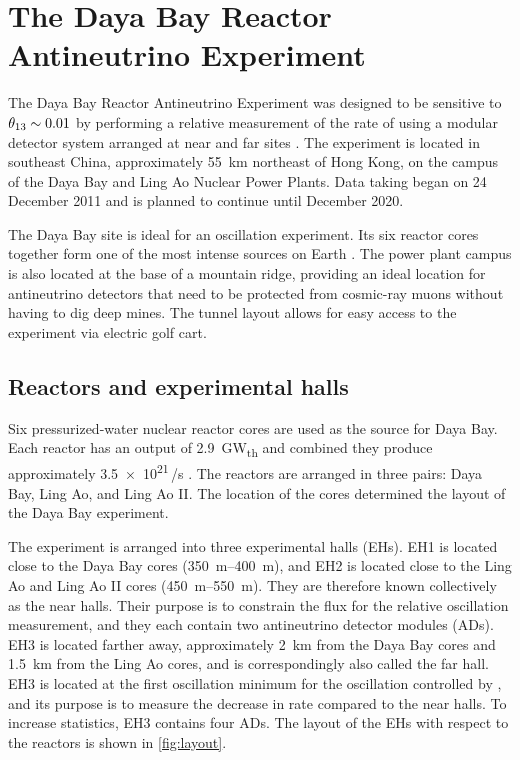 \chapter{The Daya Bay Reactor Antineutrino Experiment}
\label{ch:detector}

The Daya Bay Reactor Antineutrino Experiment was designed
to be sensitive to $\theta_{13} \sim 0.01$
by performing a relative measurement of the rate of \nuebar{}
using a modular detector system arranged at near and far sites \cite{dybproposal2006}.
The experiment is located in southeast China,
approximately \SI{55}{\km} northeast of Hong Kong,
on the campus of the Daya Bay and Ling Ao Nuclear Power Plants.
Data taking began on 24 December 2011 and is planned to continue
until December 2020.

The Daya Bay site is ideal for an oscillation experiment.
Its six reactor cores together form one of the most intense \nuebar{}
sources on Earth \cite{dybproposal2006}.
The power plant campus is also located at the base of a mountain ridge,
providing an ideal location for antineutrino detectors that need to be
protected from cosmic-ray muons without having to dig deep mines.
The tunnel layout allows for easy access to the experiment via electric golf cart.

\section{Reactors and experimental halls}

Six pressurized-water nuclear reactor cores are used
as the \nuebar{} source for Daya Bay.
Each reactor has an output of \SI{2.9}{\giga\watt_{th}}
and combined they produce approximately \num{3.5e21}\,\nuebar/s \cite{ngd2016}.
The reactors are arranged in three pairs: Daya Bay, Ling Ao, and Ling Ao II.
The location of the cores determined the layout of the Daya Bay experiment.

The experiment is arranged into three experimental halls (EHs).
EH1 is located close to the Daya Bay cores (\SIrange{350}{400}{\meter}),
and EH2 is located close to the Ling Ao and Ling Ao II cores
(\SIrange{450}{550}{\meter}).
They are therefore known collectively as the near halls.
Their purpose is to constrain the \nuebar{} flux for the
relative oscillation measurement,
and they each contain two antineutrino detector modules (ADs).
EH3 is located farther away, approximately \SI{2}{\km} from the Daya Bay cores
and \SI{1.5}{\km} from the Ling Ao cores,
and is correspondingly also called the far hall.
EH3 is located at the first oscillation minimum
for the oscillation controlled by \thetaot,
and its purpose is to measure the decrease in \nuebar{} rate compared to the near halls.
To increase statistics, EH3 contains four ADs.
The layout of the EHs with respect to the reactors is shown in \cref{fig:layout}.

